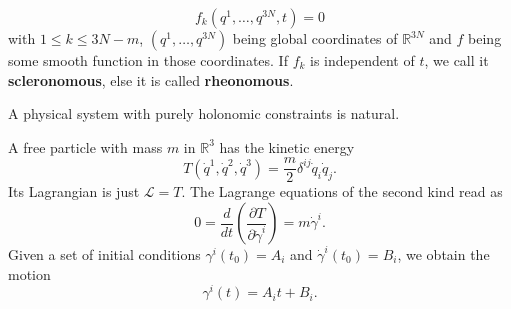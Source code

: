 \[
    f_k(q^1, \dots, q^{3N},t)=0
\] with $1 \leq k \leq 3N-m$, $(q^1, \dots, q^{3N})$ being global coordinates of $\mathbb{R}^{3N}$ and $f$ being some smooth function in those coordinates. If $f_k$ is independent of $t$, we call it \textbf{scleronomous}, else it is called \textbf{rheonomous}.
\begin{theorem}
    A physical system with purely holonomic constraints is natural.
\end{theorem}
\begin{eg}
        A free particle with mass $m$ in $\mathbb{R}^{3}$ has the kinetic energy 
            \[
                T(\dot{q}^1,\dot{q}^2,\dot{q}^3)= \frac{m}{2} \delta^{ij} \dot{q}_i \dot{q}_j  
            .\] Its Lagrangian is just $\mathcal{L}=T$. The Lagrange equations of the second kind read as
            \[
                0 = \frac{d}{dt}\left( \frac{\partial T}{\partial \dot{\gamma}^i}\right) = m\dot{\gamma}^i.
        \]
            Given a set of initial conditions $\gamma^i(t_0)=A_i$ and $\dot{\gamma}^i(t_0)=B_i$, we obtain the motion \[
            \gamma^i(t) = A_it+B_i
            .\] 
        
\end{eg}
